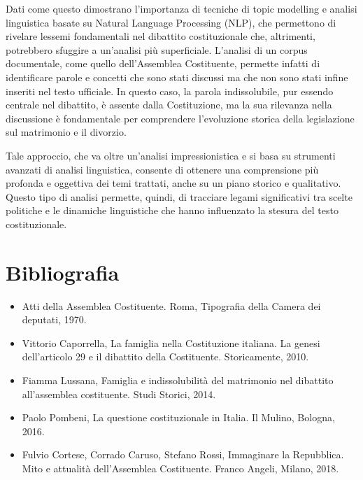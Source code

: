 \documentclass{article}
\begin{document}
Dati come questo dimostrano l’importanza di tecniche di topic modelling e analisi linguistica basate su Natural Language Processing (NLP), che permettono di rivelare lessemi fondamentali nel dibattito costituzionale che, altrimenti, potrebbero sfuggire a un’analisi più superficiale. L’analisi di un corpus documentale, come quello dell’Assemblea Costituente, permette infatti di identificare parole e concetti che sono stati discussi ma che non sono stati infine inseriti nel testo ufficiale. In questo caso, la parola indissolubile, pur essendo centrale nel dibattito, è assente dalla Costituzione, ma la sua rilevanza nella discussione è fondamentale per comprendere l’evoluzione storica della legislazione sul matrimonio e il divorzio.

Tale approccio, che va oltre un’analisi impressionistica e si basa su strumenti avanzati di analisi linguistica, consente di ottenere una comprensione più profonda e oggettiva dei temi trattati, anche su un piano storico e qualitativo. Questo tipo di analisi permette, quindi, di tracciare legami significativi tra scelte politiche e le dinamiche linguistiche che hanno influenzato la stesura del testo costituzionale.


\section{Bibliografia}

\begin{itemize}
    \item Atti della Assemblea Costituente. Roma, Tipografia della Camera dei deputati, 1970.
    \item Vittorio Caporrella, La famiglia nella Costituzione italiana. La genesi dell'articolo 29 e il dibattito della Costituente. Storicamente, 2010.
    \item Fiamma Lussana, Famiglia e indissolubilità del matrimonio nel dibattito all'assemblea costituente. Studi Storici, 2014.
    \item Paolo Pombeni, La questione costituzionale in Italia. Il Mulino, Bologna, 2016.
    \item Fulvio Cortese, Corrado Caruso, Stefano Rossi, Immaginare la Repubblica. Mito e attualità dell'Assemblea Costituente. Franco Angeli, Milano, 2018. 
\end{itemize}
\end{document}
